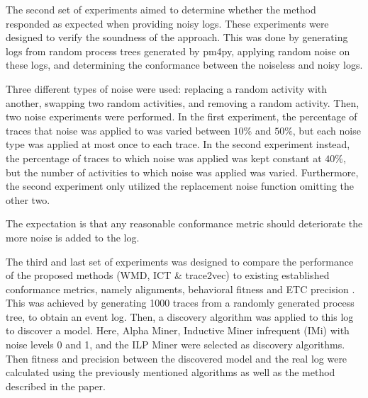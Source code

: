 \documentclass[runningheads]{template/llncs}
\begin{document}
The second set of experiments aimed to determine whether the method responded as expected when providing noisy logs.
These experiments were designed to verify the soundness of the approach.
This was done by generating logs from random process trees generated by pm4py, applying random noise on these logs, and determining the conformance between the noiseless and noisy logs.

Three different types of noise were used: replacing a random activity with another, swapping two random activities, and removing a random activity.
Then,  two noise experiments were performed.
In the first experiment, the percentage of traces that noise was applied to was varied between $10\%$ and $50\%$, but each noise type was applied at most once to each trace.
In the second experiment instead, the percentage of traces to which noise was applied was kept constant at $40\%$, but the number of activities to which noise was applied was varied.
Furthermore, the second experiment only utilized the replacement noise function  omitting the other two.

The expectation is that any reasonable conformance metric should deteriorate the more noise is added to the log.

The third and last set of experiments was designed to compare the performance of the proposed methods (WMD, ICT \& trace2vec) to existing established conformance metrics, namely alignments, behavioral fitness \cite{GMVB09} and ETC precision \cite{MuCa10}.
This was achieved by generating 1000 traces from a randomly generated process tree, to obtain an event log.
Then, a discovery algorithm was applied to this log to discover a model. Here, Alpha Miner, Inductive Miner infrequent (IMi) with noise levels 0 and 1, and the ILP Miner were selected as discovery algorithms.
Then fitness and precision between the discovered model and the real log were calculated using the previously mentioned algorithms as well as the method described in the paper.
\end{document}
